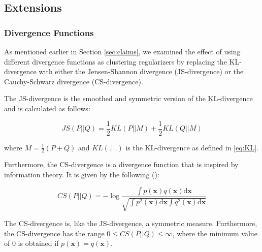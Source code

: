 
\subsection{Extensions}

\subsubsection{Divergence Functions}
As mentioned earlier in Section \ref{sec:claims}, we examined the effect of using different divergence functions as clustering regularizers by replacing the KL-divergence with either the Jensen-Shannon divergence (JS-divergence) or the Cauchy-Schwarz divergence (CS-divergence).

The JS-divergence is the smoothed and symmetric version of the KL-divergence and is calculated as follows:

\begin{equation}
    JS(P||Q) = \frac{1}{2}KL(P||M) + \frac{1}{2}KL(Q||M)
    \label{eq:JS}
\end{equation}

where $M = \frac{1}{2}(P + Q)$ and $KL(.||.)$ is the KL-divergence as defined in \ref{eq:KL}.

Furthermore, the CS-divergence is a divergence function that is inspired by information theory. It is given by the following (\cite{Cauchy_Schwarz_divergence}):

\begin{equation}
    CS(P||Q) = -\log \frac{\int p(\textbf{x}) q(\textbf{x}) \text{d}\textbf{x}}{\sqrt{\int p^2(\textbf{x}) \text{d}\textbf{x} \int q^2(\textbf{x}) \text{d}\textbf{x}}}
    \label{eq:CS}
\end{equation}

The CS-divergence is, like the JS-divergence, a symmetric measure. Furthermore, the CS-divergence has the range $0 \leq CS(P || Q) \leq \infty$, where the minimum value of $0$ is obtained if $p(\textbf{x}) = q(\textbf{x})$.

